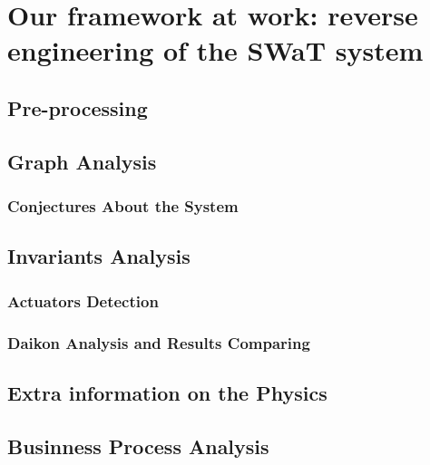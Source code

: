 \chapter{Our framework at work: reverse engineering of the SWaT system}
\label{application}

\section{Pre-processing}
\label{sec:app_preprocessing}

\section{Graph Analysis}
\label{sec:app_graphs}

\subsection{Conjectures About the System}

\section{Invariants Analysis}
\label{sec:app_invariants}

\subsection{Actuators Detection}
\subsection{Daikon Analysis and Results Comparing}

\section{Extra information on the Physics}
\label{sec:app_extrainfo}

\section{Businness Process Analysis}
\label{sec:app_bpa}